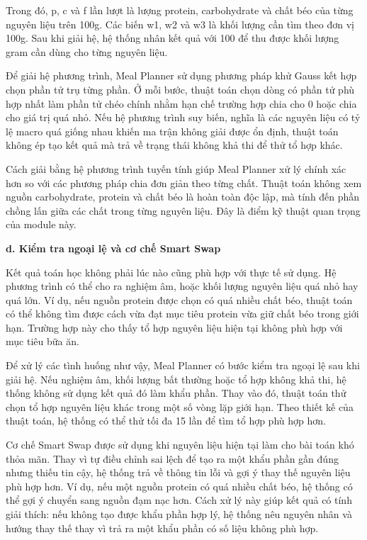 \documentclass[12pt, a4paper]{report}
\begin{document}
Trong đó, p, c và f lần lượt là lượng protein, carbohydrate và chất béo của từng nguyên liệu trên 100g. Các biến w1, w2 và w3 là khối lượng cần tìm theo đơn vị 100g. Sau khi giải hệ, hệ thống nhân kết quả với 100 để thu được khối lượng gram cần dùng cho từng nguyên liệu.

Để giải hệ phương trình, Meal Planner sử dụng phương pháp khử Gauss kết hợp chọn phần tử trụ từng phần. Ở mỗi bước, thuật toán chọn dòng có phần tử phù hợp nhất làm phần tử chéo chính nhằm hạn chế trường hợp chia cho 0 hoặc chia cho giá trị quá nhỏ. Nếu hệ phương trình suy biến, nghĩa là các nguyên liệu có tỷ lệ macro quá giống nhau khiến ma trận không giải được ổn định, thuật toán không ép tạo kết quả mà trả về trạng thái không khả thi để thử tổ hợp khác.

Cách giải bằng hệ phương trình tuyến tính giúp Meal Planner xử lý chính xác hơn so với các phương pháp chia đơn giản theo từng chất. Thuật toán không xem nguồn carbohydrate, protein và chất béo là hoàn toàn độc lập, mà tính đến phần chồng lấn giữa các chất trong từng nguyên liệu. Đây là điểm kỹ thuật quan trọng của module này.

\textbf{d. Kiểm tra ngoại lệ và cơ chế Smart Swap}

Kết quả toán học không phải lúc nào cũng phù hợp với thực tế sử dụng. Hệ phương trình có thể cho ra nghiệm âm, hoặc khối lượng nguyên liệu quá nhỏ hay quá lớn. Ví dụ, nếu nguồn protein được chọn có quá nhiều chất béo, thuật toán có thể không tìm được cách vừa đạt mục tiêu protein vừa giữ chất béo trong giới hạn. Trường hợp này cho thấy tổ hợp nguyên liệu hiện tại không phù hợp với mục tiêu bữa ăn.

Để xử lý các tình huống như vậy, Meal Planner có bước kiểm tra ngoại lệ sau khi giải hệ. Nếu nghiệm âm, khối lượng bất thường hoặc tổ hợp không khả thi, hệ thống không sử dụng kết quả đó làm khẩu phần. Thay vào đó, thuật toán thử chọn tổ hợp nguyên liệu khác trong một số vòng lặp giới hạn. Theo thiết kế của thuật toán, hệ thống có thể thử tối đa 15 lần để tìm tổ hợp phù hợp hơn.

Cơ chế Smart Swap được sử dụng khi nguyên liệu hiện tại làm cho bài toán khó thỏa mãn. Thay vì tự điều chỉnh sai lệch để tạo ra một khẩu phần gần đúng nhưng thiếu tin cậy, hệ thống trả về thông tin lỗi và gợi ý thay thế nguyên liệu phù hợp hơn. Ví dụ, nếu một nguồn protein có quá nhiều chất béo, hệ thống có thể gợi ý chuyển sang nguồn đạm nạc hơn. Cách xử lý này giúp kết quả có tính giải thích: nếu không tạo được khẩu phần hợp lý, hệ thống nêu nguyên nhân và hướng thay thế thay vì trả ra một khẩu phần có số liệu không phù hợp.
\end{document}
